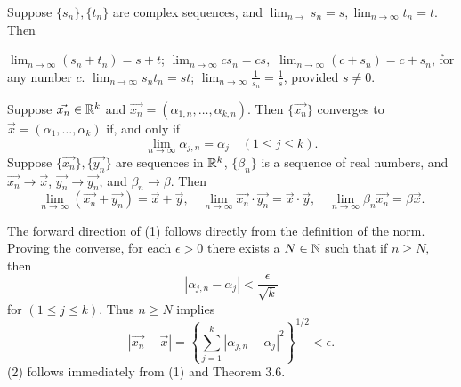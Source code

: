 \documentclass{article}
\begin{document}
\begin{theorem}
    Suppose $\{s_{n}\},\{t_{n}\}$ are complex sequences, and $\lim_{n\rightarrow}s_{n}=s,\lim_{n\rightarrow\infty}t_{n}=t$. Then
    \begin{enumerate}
        \ii $\lim_{n\rightarrow\infty}(s_{n}+t_{n})=s+t$;
        \ii $\lim_{n\rightarrow\infty}cs_{n}=cs,$ $\lim_{n\rightarrow\infty}(c+s_{n})=c+s_{n}$, for any number $c$.
        \ii $\lim_{n\rightarrow\infty}s_{n}t_{n}=st$;
        \ii $\lim_{n\rightarrow\infty}\frac{1}{s_{n}}=\frac{1}{s}$, provided $s\neq 0$.
    \end{enumerate}
\end{theorem}
\begin{theorem}
    \listhack 
    \begin{enumerate}
        \ii Suppose $\vec{x_{n}}\in\mathbb R^{k}$ and $\vec{x_{n}}=(\alpha_{1,n},\dotsc,\alpha_{k,n}).$ Then $\{\vec{x_{n}}\}$ converges to $\vec{x}=(\alpha_{1},\dotsc,\alpha_{k})$ if, and only if \[\lim_{n\rightarrow\infty}\alpha_{j,n}=\alpha_{j}\quad(1\leq j\leq k).\]
        \ii Suppose $\{\vec{x_{n}}\},\{\vec{y_{n}}\}$ are sequences in $\mathbb R^{k}$, $\{\beta_{n}\}$ is a sequence of real numbers, and $\vec{x_{n}}\rightarrow\vec{x}$, $\vec{y_{n}}\rightarrow\vec{y_{n}}$, and $\beta_{n}\rightarrow\beta$. Then 
        \[\lim_{n\rightarrow\infty}(\vec{x_{n}}+\vec{y_{n}})=\vec{x}+\vec{y},\quad\lim_{n\rightarrow\infty}\vec{x_{n}}\cdot\vec{y_{n}}=\vec{x}\cdot\vec{y},\quad\lim_{n\rightarrow\infty}\beta_{n}\vec{x_{n}}=\beta\vec{x}.\]
    \end{enumerate}
\end{theorem}   
\begin{remark}
    The forward direction of (1) follows directly from the definition of the norm. Proving the converse, for each $\epsilon>0$ there exists a $N\in\mathbb N$ such that if $n\geq N,$ then \[|\alpha_{j,n}-\alpha_{j}|<\frac{\epsilon}{\sqrt{k}}\]for $(1\leq j\leq k)$. Thus $n\geq N$ implies \[|\vec{x_{n}}-\vec{x}|=\left\{\sum_{j=1}^{k}|\alpha_{j,n}-\alpha_{j}|^{2}\right\}^{1/2}<\epsilon.\]
    (2) follows immediately from (1) and Theorem 3.6.
\end{remark}
\end{document}
